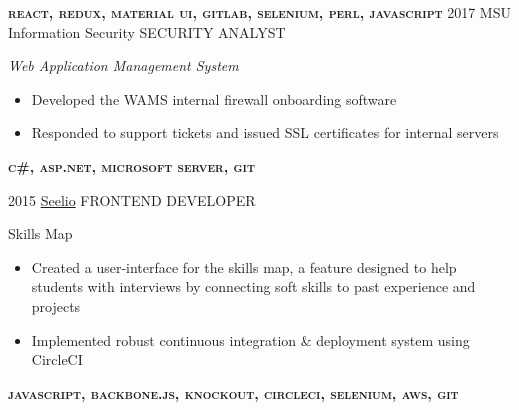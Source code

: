 \documentclass[]{friggeri-cv}
\begin{document}
\begin{entrylist}
{    \textbf{\textsc{react, redux, material ui, gitlab, selenium, perl, javascript}}
    \vspace{10pt}
  }
\entry
  {2017}
  {\textcolor{gray}{\FA \faLock} MSU Information Security}
  {SECURITY ANALYST}
  {
    \textit{Web Application Management System}
    \begin{itemize}[topsep=6pt,leftmargin=0pt,itemsep=6pt]
      \item Developed the WAMS internal firewall onboarding software %
      \item Responded to support tickets and issued SSL certificates for internal servers 
    \end{itemize}
    \textbf{\textsc{c\#, asp.net, microsoft server, git}}
    \vspace{10pt}
  }
\entry
  {2015}
  {\textcolor{gray}{\FA \faMapMarker} \href{http://www.seelio.com/}{Seelio} }
  {FRONTEND DEVELOPER}
  {
    Skills Map
    \begin{itemize}[topsep=6pt,leftmargin=0pt,itemsep=6pt]
      \item Created a user-interface for the skills map, a feature designed
        to help students with interviews by connecting soft skills to past experience and projects
      \item {
          Implemented  robust continuous integration \& deployment system using CircleCI%
        }
    \end{itemize}
    \textbf{\textsc{javascript, backbone.js, knockout, circleci, selenium, aws, git}}
    \vspace{10pt}
  }


\end{entrylist}
\end{document}
